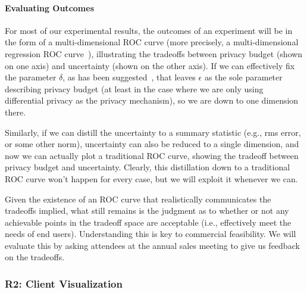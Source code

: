 \paragraph{Evaluating Outcomes}
For most of our experimental results, the outcomes of an experiment
will be in the form of a multi-dimensional ROC curve
(more precisely, a multi-dimensional
regression ROC curve~\cite{Fawcett06,HO13,Mossman99}), illustrating
the tradeoffs between privacy budget (shown on one axis) and uncertainty
(shown on the other axis). If we can effectively fix the parameter $\delta$,
as has been suggested~\cite{dr14}, that leaves $\epsilon$ as the
sole parameter describing privacy budget (at least in the case where
we are only using differential privacy as the privacy mechanism), so we
are down to one dimension there.

Similarly, if we can distill the uncertainty to a summary statistic
(e.g., rms error, or some other norm), uncertainty can also be reduced
to a single dimension, and now we can actually plot a traditional ROC
curve, showing the tradeoff between privacy budget and uncertainty.
Clearly, this distillation down to a traditional ROC curve won't happen
for every case, but we will exploit it whenever we can.

Given the existence of an ROC curve that realistically communicates the
tradeoffs implied, what still remains is the judgment as to whether or
not any achievable points in the tradeoff space are acceptable (i.e.,
effectively meet the needs of end users).  Understanding
this is key to commercial
feasibility. We will evaluate this by
asking attendees at the annual sales meeting to give us feedback on 
the tradeoffs.

\subsubsection{R2: Client Visualization}

